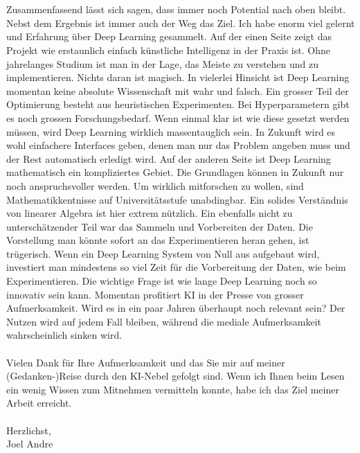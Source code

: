 \\ \\ 
Zusammenfassend lässt sich sagen, dass immer noch Potential nach oben bleibt. Nebst dem Ergebnis ist immer auch der Weg das Ziel. Ich habe enorm viel gelernt und Erfahrung über Deep Learning gesammelt. Auf der einen Seite zeigt das Projekt wie erstaunlich einfach künstliche Intelligenz in der Praxis ist. Ohne jahrelanges Studium ist man in der Lage, das Meiste zu verstehen und zu implementieren. Nichts daran ist magisch. In vielerlei Hinsicht ist Deep Learning momentan keine absolute Wissenschaft mit wahr und falsch. Ein grosser Teil der Optimierung besteht aus heuristischen Experimenten. Bei Hyperparametern gibt es noch grossen Forschungsbedarf. Wenn einmal klar ist wie diese gesetzt werden müssen, wird Deep Learning wirklich massentauglich sein. In Zukunft wird es wohl einfachere Interfaces geben, denen man nur das Problem angeben muss und der Rest automatisch erledigt wird. Auf der anderen Seite ist Deep Learning mathematisch ein kompliziertes Gebiet. Die Grundlagen können in Zukunft nur noch anspruchsvoller werden. Um wirklich mitforschen zu wollen, sind Mathematikkentnisse auf Universitätsstufe unabdingbar. Ein solides Verständnis von linearer Algebra ist hier extrem nützlich. Ein ebenfalls nicht zu unterschätzender Teil war das Sammeln und Vorbereiten der Daten. Die Vorstellung man könnte sofort an das Experimentieren heran gehen, ist trügerisch. Wenn ein Deep Learning System von Null aus aufgebaut wird, investiert man mindestens so viel Zeit für die Vorbereitung der Daten, wie beim Experimentieren. Die wichtige Frage ist wie lange Deep Learning noch so innovativ sein kann. Momentan profitiert KI in der Presse von grosser Aufmerksamkeit. Wird es in ein paar Jahren überhaupt noch relevant sein? Der Nutzen wird auf jedem Fall bleiben, während die mediale Aufmerksamkeit wahrscheinlich sinken wird.
\\ \\
Vielen Dank für Ihre Aufmerksamkeit und das Sie mir auf meiner (Gedanken-)Reise durch den KI-Nebel gefolgt sind. Wenn ich Ihnen beim Lesen ein wenig Wissen zum Mitnehmen vermitteln konnte, habe ich das Ziel meiner Arbeit erreicht. 
\\ \\
Herzlichst, \\
Joel Andre
